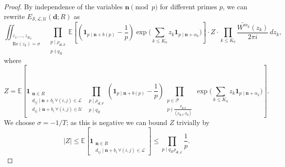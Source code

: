 \documentclass[11pt]{amsart}
\theoremstyle{definition}
\renewcommand{\leq}{\leqslant}
\renewcommand{\Re}{\mathrm{Re}}
\newcommand{\ind}[1]{\mathbf{1}_{#1}}
\newcommand{\primes}{\mathcal{P}}
\renewcommand{\d}{\boldsymbol{d}}
\newcommand{\pcomp}[2]{d_{#1#2}}
\newcommand{\n}{\mathbf{n}}
\newcommand{\sommespart}{b}
\newcommand{\fprod}[1]{\rho_{#1}}
\newcommand{\lit}{\mathcal{L}}
\newcommand{\unlit}{\mathcal{U}}
\newcommand{\s}{\mathcal{S}}
\newcommand{\modulus}{q}
\newcommand{\otherL}{T}
\newcommand{\littleh}{k}
\begin{document}
\begin{proof}
By independence of the variables $\n \!\pmod p$ for different primes $p$, we can rewrite $E_{\s,\lit,\unlit}(\d; R)$ as
\begin{equation}
\label{eq:cancel1}
\iint_{\substack{z_1,\dots,z_{K_0}\\ \Re(z_{\littleh})=\sigma}} 
 \prod_{\substack{p\mid \fprod{\d; \s}\\ p\nmid \modulus_R}} \mathbb{E} \left[\left(\ind{p \mid \n+\sommespart(p)} - \frac{1}{p}\right) \exp \bigg(\sum_{\littleh \leq K_0} z_{\littleh} \ind{p\mid \n + \alpha_{\littleh}}\bigg) \right] \cdot Z \cdot
  \prod_{\littleh \leq K_0}\frac{\widetilde{W^{m_{\littleh}}}(z_{\littleh})}{2\pi i} \, dz_{\littleh},
\end{equation}
where
\begin{equation*}
Z =  \mathbb{E} \left[\ind{\substack{\n\in R\qquad\qquad\ \\ \pcomp{i}{j}\mid \n+\sommespart_i \, \forall (i,j)\in \lit \,\\ \pcomp{i}{j}\nmid \n+\sommespart_i \, \forall (i,j)\in \unlit}}  \,\prod_{\substack{p\mid \fprod{\d; \s}\\ p \mid \modulus_{R}}}\left(\ind{p \mid \n+\sommespart(p)} - \frac{1}{p}\right)  \prod_{\substack{p\in \primes\\ p\nmid \frac{\fprod{\d; \s}}{(\fprod{\d; \s}, \modulus_R)}}} \exp \bigg(\sum_{\littleh \leq K_0} z_{\littleh} \ind{p\mid \n + \alpha_{\littleh}}\bigg)  \right].
\end{equation*}
We choose $\sigma = {-1}/{\otherL}$; as this is negative we can bound $Z$ trivially by 
\begin{equation}
\label{eq:cancel2}
|Z| \leq \mathbb{E} \left[ \ind{\substack{\n\in R\qquad\qquad\ \\ \pcomp{i}{j}\mid \n+\sommespart_i \, \forall (i,j)\in \lit}}\right] \leq \prod_{p\mid \modulus_{R}\fprod{\d; \lit}} \frac 1p.
\end{equation}


\end{proof}
\end{document}
